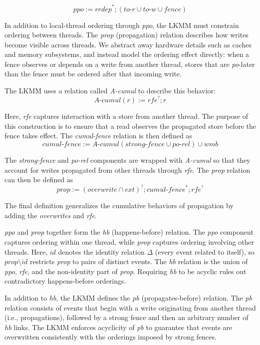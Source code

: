 \[
\mathit{ppo} := \mathit{rrdep}^{*} \mathbin{;} (\mathit{to\text{-}r} \cup \mathit{to\text{-}w} \cup \mathit{fence})
\]

In addition to local-thread ordering through \textit{ppo}, the LKMM must constrain ordering between threads. The \textit{prop} (propagation) relation describes how writes become visible across threads. We abstract away hardware details such as caches and memory subsystems, and instead model the ordering effect directly: when a fence observes or depends on a write from another thread, stores that are \textit{po}-later than the fence must be ordered after that incoming write.

The LKMM uses a relation called \textit{A-cumul} to describe this behavior:
\[
\mathit{A\text{-}cumul}(r) := \mathit{rfe}^? \mathbin{;} r
\]

Here, \textit{rfe} captures interaction with a store from another thread. The purpose of this construction is to ensure that a read observes the propagated store before the fence takes effect. The \textit{cumul-fence} relation is then defined as
\[
\mathit{cumul\text{-}fence} := \mathit{A\text{-}cumul}(\mathit{strong\text{-}fence} \cup \mathit{po\text{-}rel}) \cup \mathit{wmb}
\]

The \textit{strong-fence} and \textit{po-rel} components are wrapped with \textit{A-cumul} so that they account for writes propagated from other threads through \textit{rfe}. The \textit{prop} relation can then be defined as
\[
\mathit{prop} := (\mathit{overwrite} \cap \mathit{ext})^? \mathbin{;} \mathit{cumul\text{-}fence}^{*} \mathbin{;} \mathit{rfe}^?
\]

The final definition generalizes the cumulative behaviors of propagation by adding the \textit{overwrites} and \textit{rfe}.

\textit{ppo} and \textit{prop} together form the \textit{hb} (happens-before) relation. The \textit{ppo} component captures ordering within one thread, while \textit{prop} captures ordering involving other threads. Here, $\mathit{id}$ denotes the identity relation $\Delta$ (every event related to itself), so $\mathit{prop} \setminus \mathit{id}$ restricts \textit{prop} to pairs of distinct events. The \textit{hb} relation is the union of \textit{ppo}, \textit{rfe}, and the non-identity part of \textit{prop}. Requiring \textit{hb} to be acyclic rules out contradictory happens-before orderings.

In addition to \textit{hb}, the LKMM defines the \textit{pb} (propagates-before) relation. The \textit{pb} relation consists of events that begin with a write originating from another thread (i.e., propagations), followed by a strong fence and then an arbitrary number of \textit{hb} links. The LKMM enforces acyclicity of \textit{pb} to guarantee that events are overwritten consistently with the orderings imposed by strong fences.

